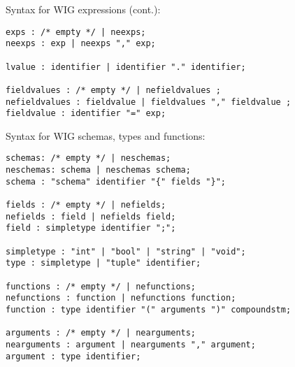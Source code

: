 \begin{slide*}
Syntax for WIG expressions (cont.):
 
\begin{scriptsize}
\begin{verbatim}
exps : /* empty */ | neexps;
neexps : exp | neexps "," exp;

lvalue : identifier | identifier "." identifier;

fieldvalues : /* empty */ | nefieldvalues ;
nefieldvalues : fieldvalue | fieldvalues "," fieldvalue ;
fieldvalue : identifier "=" exp;
\end{verbatim}
\end{scriptsize}
\vfil
\end{slide*}

\begin{slide*}
Syntax for WIG schemas, types and functions:

\begin{scriptsize}
\begin{verbatim}
schemas: /* empty */ | neschemas;
neschemas: schema | neschemas schema;
schema : "schema" identifier "{" fields "}";

fields : /* empty */ | nefields;
nefields : field | nefields field;
field : simpletype identifier ";";

simpletype : "int" | "bool" | "string" | "void";
type : simpletype | "tuple" identifier;

functions : /* empty */ | nefunctions;
nefunctions : function | nefunctions function;
function : type identifier "(" arguments ")" compoundstm;

arguments : /* empty */ | nearguments;
nearguments : argument | nearguments "," argument;
argument : type identifier;
\end{verbatim}
\end{scriptsize}
\vfil
\end{slide*}

